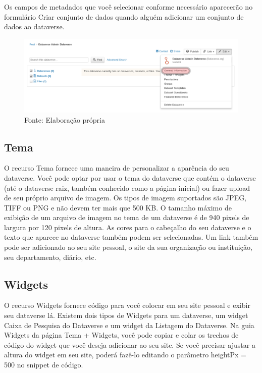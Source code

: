 \documentclass[12pt,hidelinks]{article}
\begin{document}
Os campos de metadados que você selecionar conforme necessário aparecerão no formulário Criar conjunto de dados quando alguém adicionar um conjunto de dados ao dataverse.

 \begin{figure}[H]
\centering
    \includegraphics[width=1.0\textwidth]{Prints/p5.png}
    \caption{Fonte: Elaboração própria}
    \label{print5}
\end{figure}

    \subsection{Tema}
    
\qquad O recurso Tema fornece uma maneira de personalizar a aparência do seu dataverse. Você pode optar por usar o tema do dataverse que contém o dataverse (até o dataverse raiz, também conhecido como a página inicial) ou fazer upload de seu próprio arquivo de imagem. Os tipos de imagem suportados são JPEG, TIFF ou PNG e não devem ter mais que 500 KB. O tamanho máximo de exibição de um arquivo de imagem no tema de um dataverse é de 940 pixels de largura por 120 pixels de altura. As cores para o cabeçalho do seu dataverse e o texto que aparece no dataverse também podem ser selecionadas. Um link também pode ser adicionado ao seu site pessoal, o site da sua organização ou instituição, seu departamento, diário, etc.

    \subsection{Widgets}
    
\qquad O recurso Widgets fornece código para você colocar em seu site pessoal e exibir seu dataverse lá. Existem dois tipos de Widgets para um dataverse, um widget Caixa de Pesquisa do Dataverse e um widget da Listagem do Dataverse. Na guia Widgets da página Tema + Widgets, você pode copiar e colar os trechos de código do widget que você deseja adicionar ao seu site. Se você precisar ajustar a altura do widget em seu site, poderá fazê-lo editando o parâmetro heightPx = 500 no snippet de código.
    
\end{document}
